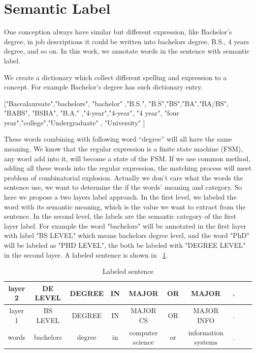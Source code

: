 \section{Semantic Label}

One conception always have similar but different expression, like Bachelor's degree, in job descriptions it could be written into bachelors degree, B.S., 4 years degree, and so on. In this work, we annotate words in the sentence with semantic label.

We create a dictionary which collect different spelling and expression to a concept. For example  Bachelor's degree has such dictionary entry.

["Baccalaureate","bachelors", "bachelor" ,"B.S.", "B.S","BS","BA","BA/BS", "BABS", "BSBA", "B.A." ,"4-year","4-year", "4 year", "four year","college","Undergraduate" , "University" ]

These words combining with following word ``degree'' will all have the same meaning. We know that the regular expression is a finite state machine (FSM), any word add into it, will become a state of the FSM. If we use common method, adding all these words into the regular expression, the matching process will meet problem of combinatorial explosion. Actually we don't care what the words the sentence use, we want to determine the if the words' meaning and category. So here we propose a two layers label approach. In the first level, we labeled the word with its semantic meaning, which is the value we want to extract from the sentence. In the second level, the labels are the semantic category of the first layer label. For example the word "bachelors" will be annotated in the first layer with label "BS LEVEL" which means bachelors degree level, and the word "PhD" will be labeled as "PHD LEVEL", the both be labeled with "DEGREE LEVEL" in the second layer. A labeled sentence is shown in ~\ref{tab:labeldsent}.

\begin{table}[ht]
\caption{Labeled sentence } %
\centering %
\begin{tabular}{  | c | c | c | c | c |c | c |c | c | c |  }
 \hline
 layer 2 & DE LEVEL   & DEGREE & IN & MAJOR            & OR & MAJOR  &.  \\
 \hline
 layer 1 &  BS LEVEL   & DEGREE & IN & MAJOR CS         & OR & MAJOR INFO & .      \\
 \hline
   words & bachelors   & degree & in & computer science & or & information systems & .     \\
  \hline
\end{tabular}
\label{tab:labeldsent} %
\end{table}


